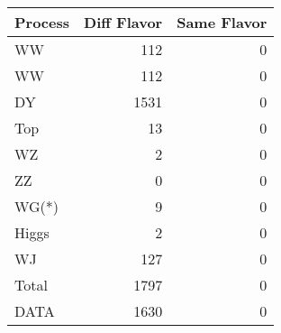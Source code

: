 \begin{table}[ht]
	\centering
\begin{tabular}{lrr}

Process &  Diff Flavor &  Same Flavor \\
		\hline
     WW &          112 &            0 \\
     WW &          112 &            0 \\
     DY &         1531 &            0 \\
    Top &           13 &            0 \\
     WZ &            2 &            0 \\
     ZZ &            0 &            0 \\
  WG(*) &            9 &            0 \\
  Higgs &            2 &            0 \\
     WJ &          127 &            0 \\
\hline
  Total &         1797 &            0 \\
   DATA &         1630 &            0 \\


\end{tabular}

\end{table}